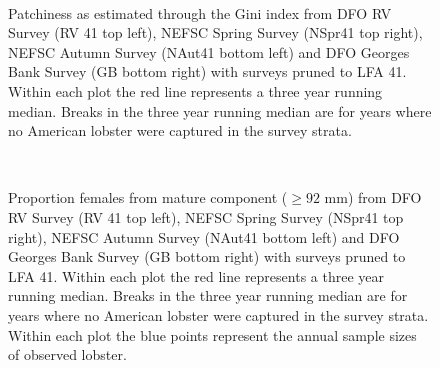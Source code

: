 \documentclass[11pt]{article}
\newcommand{\e}{/backup/bio_data/bio.lobster/figures/} %
\begin{document}
\begin{figure}
\centering
{}\\

\caption{Patchiness as estimated through the Gini index from DFO RV Survey (RV 41 top left), NEFSC Spring Survey (NSpr41 top right), NEFSC Autumn Survey (NAut41 bottom left) and DFO Georges Bank Survey (GB bottom right) with surveys pruned to LFA 41. Within each plot the red line represents a three year running median. Breaks in the three year running median are for years where no American lobster were captured in the survey strata.}
\end{figure}
\clearpage

\begin{figure}
\centering
{}\\

\caption{Proportion females from mature component ($ \ge 92$ mm) from DFO RV Survey (RV 41 top left), NEFSC Spring Survey (NSpr41 top right), NEFSC Autumn Survey (NAut41 bottom left) and DFO Georges Bank Survey (GB bottom right) with surveys pruned to LFA 41. Within each plot the red line represents a three year running median. Breaks in the three year running median are for years where no American lobster were captured in the survey strata. Within each plot the blue points represent the annual sample sizes of observed lobster.}
\end{figure}
\clearpage
\end{document}
